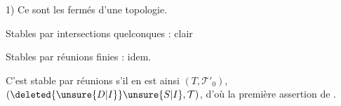 1) Ce sont les fermés d'une topologie.

Stables par intersections quelconques : clair

Stables par réunions finies : idem.

C'est \unsure{$=$} stable par réunions  s'il en est ainsi  $(T,\mathcal{T}'_0)$, $(\deleted{\unsure{D|I}}\unsure{S|I},\mathcal{T})$, d'où la première assertion de .

